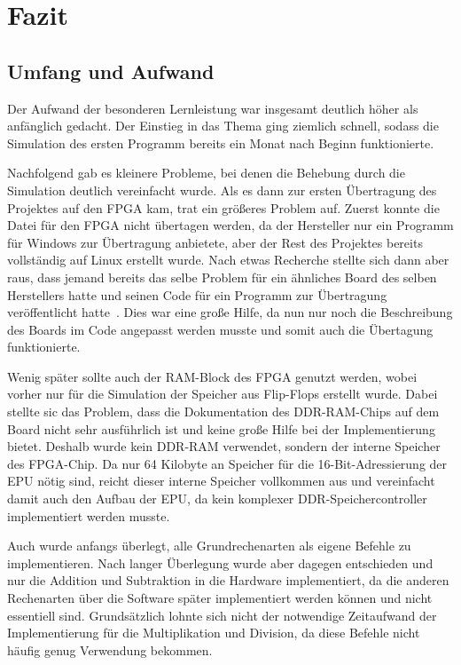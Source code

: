 \chapter{Fazit}
\label{c:fazit}
\section{Umfang und Aufwand}
Der Aufwand der besonderen Lernleistung war insgesamt deutlich höher als
anfänglich gedacht. Der Einstieg in das Thema ging ziemlich schnell, sodass die
Simulation des ersten Programm bereits ein Monat nach Beginn funktionierte.

Nachfolgend gab es kleinere Probleme, bei denen die Behebung durch die
Simulation deutlich vereinfacht wurde. Als es dann zur ersten Übertragung des
Projektes auf den \ac{FPGA} kam, trat ein größeres Problem auf. Zuerst konnte die
Datei für den \ac{FPGA} nicht übertagen werden, da der Hersteller nur ein Programm
für Windows zur Übertragung anbietete, aber der Rest des Projektes bereits
vollständig auf Linux erstellt wurde. Nach etwas Recherche stellte sich dann
aber raus, dass jemand bereits das selbe Problem für ein ähnliches Board des
selben Herstellers hatte und seinen Code für ein Programm zur Übertragung
veröffentlicht hatte~\cite{numatoloader}. Dies war eine große Hilfe, da nun nur noch die
Beschreibung des Boards im Code angepasst werden musste und somit auch die
Übertagung funktionierte.

Wenig später sollte auch der RAM-Block des \ac{FPGA} genutzt werden, wobei
vorher nur für die Simulation der Speicher aus Flip-Flops erstellt wurde. Dabei
stellte sic das Problem, dass die Dokumentation des DDR-RAM-Chips auf dem Board
nicht sehr ausführlich ist und keine große Hilfe bei der Implementierung bietet.
Deshalb wurde kein DDR-RAM verwendet, sondern der interne Speicher des
\ac{FPGA}-Chip. Da nur 64 Kilobyte an Speicher für die 16-Bit-Adressierung der
\ac{EPU} nötig sind, reicht dieser interne Speicher vollkommen aus und
vereinfacht damit auch den Aufbau der \ac{EPU}, da kein komplexer
DDR-Speichercontroller implementiert werden musste.

Auch wurde anfangs überlegt, alle Grundrechenarten als eigene Befehle zu
implementieren. Nach langer Überlegung wurde aber dagegen entschieden und nur
die Addition und Subtraktion in die Hardware implementiert, da die anderen
Rechenarten über die Software später implementiert werden können und nicht
essentiell sind. Grundsätzlich lohnte sich nicht der notwendige Zeitaufwand der
Implementierung für die Multiplikation und Division, da diese Befehle nicht
häufig genug Verwendung bekommen.

